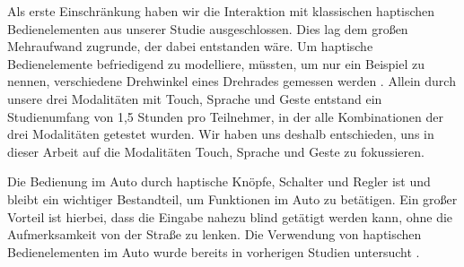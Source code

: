 Als erste Einschränkung haben wir die Interaktion mit klassischen haptischen Bedienelementen aus unserer Studie ausgeschlossen.
Dies lag dem großen Mehraufwand zugrunde, der dabei entstanden wäre.
Um haptische Bedienelemente befriedigend zu modelliere, müssten, um nur ein Beispiel zu nennen, verschiedene Drehwinkel eines Drehrades gemessen werden \citep{schneegass_2009}.
Allein durch unsere drei Modalitäten mit Touch, Sprache und Geste entstand ein Studienumfang von 1,5 Stunden pro Teilnehmer, in der alle Kombinationen der drei Modalitäten getestet wurden.
Wir haben uns deshalb entschieden, uns in dieser Arbeit auf die Modalitäten Touch, Sprache und Geste zu fokussieren.

Die Bedienung im Auto durch haptische Knöpfe, Schalter und Regler ist und bleibt ein wichtiger Bestandteil, um Funktionen im Auto zu betätigen.
Ein großer Vorteil ist hierbei, dass die Eingabe nahezu blind getätigt werden kann, ohne die Aufmerksamkeit von der Straße zu lenken.
Die Verwendung von haptischen Bedienelementen im Auto wurde bereits in vorherigen Studien untersucht \citep{Pettitt_2007,schneegass_2009,SchneegaB_2011}.

